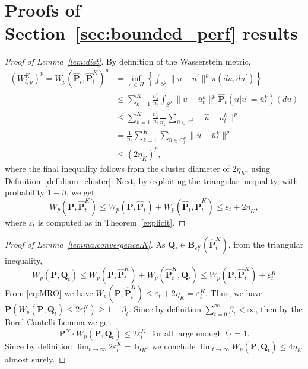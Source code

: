 \documentclass[12pt]{article}
\newcommand{\prob}{{\mathbf P}}
\newcommand{\supp}{S}
\newcommand{\unc}{u}
\newcommand{\eps}{\varepsilon^K}
\newcommand{\epsnom}{\varepsilon}
\newcommand{\ld}{W}
\begin{document}
\section{Proofs of Section~\ref{sec:bounded_perf} results}
\fi
\label{app:bounded_perf_1}
\begin{proof}[Proof of Lemma~\ref{lem:dist}]
By definition of the Wasserstein metric,
\begin{equation*}
\begin{aligned}
(\ld^K_{t,p})^p = W_p(\hat{\prob}_t, \hat{\mathbf{P}}^K_t)^p & = \inf_{\pi \in \Pi}\left \{\int_{{\supp}^2} \|\unc - \unc^\prime\|^p\pi(d\unc, d\unc^\prime)\right\}\\
& \leq \sum_{k=1}^K \frac{n^t_k}{n_t} \int_{\supp^2}\|\unc-\bar{u}^k_t\|^p \hat{\prob}_t(\unc|\unc^\prime = \bar{u}^k_t)(du)\\
& \leq \sum_{k=1}^K \frac{n_k^t}{n_t} \frac{1}{n_k^t} \sum_{ \hat{\unc}\in C^k_t}\|\hat{\unc} - \bar{u}^k_t\|^p\\
& = \frac{1}{n_t}  \sum_{k=1}^K\sum_{\hat{\unc}\in C^k_t}\|\hat{\unc}- \bar{u}^k_t\|^p\\
& \leq (2\eta_K)^p,
\end{aligned}
\end{equation*}
where the final inequality follows from the cluster diameter of $2\eta_K$, using Definition~\ref{def:diam_cluster}. Next, by exploiting the triangular inequality, with probability $1-\beta$, we get
\begin{equation}\label{eq:MRO}
W_p(\mathbf{P}, \hat{\mathbf{P}}^K_t) \leq W_p(\mathbf{P}, \hat{\prob}_t) + W_p(\hat{\mathbf{P}}_t, \hat{\mathbf{P}}^K_t) \leq \epsnom_t + 2\eta_K,
\end{equation}
where $\epsnom_t$ is computed as in Theorem~\ref{explicit}. 
\end{proof}

\begin{proof}[Proof of Lemma~\ref{lemma:convergence:K}]
As $\mathbf{Q}_t \in \mathbf{B}_{\eps_{t}}(\hat{\mathbf{P}}_{t}^K)$, from the triangular inequality,
$$
W_p(\mathbf{P}, \mathbf{Q}_t) \leq W_p(\mathbf{P}, \hat{\mathbf{P}}^K_{t}) + W_p(\hat{\mathbf{P}}^K_{t}, \mathbf{Q}_t) \leq W_p(\mathbf{P}, \hat{\mathbf{P}}^K_{t}) + \eps_{t} $$
From \eqref{eq:MRO} we have $W_p(\mathbf{P}, \hat{\mathbf{P}}^K_{t}) \leq \epsnom_{t} + 2\eta_K = \eps_{t}$. Thus, we have $\mathbf{P}(W_p(\mathbf{P}, \mathbf{Q}_t) \leq 2\eps_{t}) \geq 1 - \beta_{t}$.
Since by definition $\sum_{t=0}^\infty \beta_t < \infty$, then by the Borel-Cantelli Lemma we get
$$
\mathbf{P}^\infty\{W_p(\mathbf{P}, \mathbf{Q}_t) \leq 2\eps_{t} \text{~~for all large enough $t$}\} = 1.
$$
Since by definition
$\lim_{t \rightarrow \infty} 2\eps_{t} = 4\eta_K$, we conclude $\lim_{t\rightarrow \infty}  W_p(\mathbf{P}, \mathbf{Q}_t) \leq 4\eta_K$ almost surely.
\end{proof}
\end{document}
